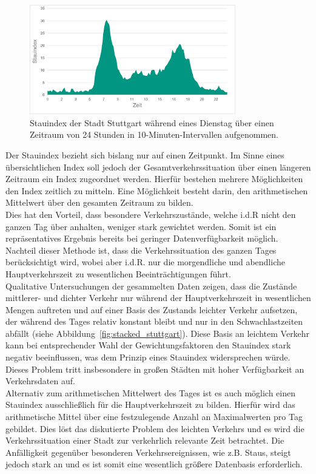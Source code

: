 \begin{figure}
  \centering
    \includegraphics[width=0.8\textwidth]{images/stauindex.png}
    \caption{Stauindex der Stadt Stuttgart während eines Dienstag über einen Zeitraum von 24 Stunden in 10-Minuten-Intervallen aufgenommen.}
    \label{fig:stauindex_stuttgart}
\end{figure}

Der Stauindex bezieht sich bislang nur auf einen Zeitpunkt. Im Sinne eines übersichtlichen Index soll jedoch der Gesamtverkehrssituation über einen längeren Zeitraum ein Index zugeordnet werden. Hierfür bestehen mehrere Möglichkeiten den Index zeitlich zu mitteln. Eine Möglichkeit besteht darin, den arithmetischen Mittelwert über den gesamten Zeitraum zu bilden.\\ 
Dies hat den Vorteil, dass besondere Verkehrszustände, welche i.d.R nicht den ganzen Tag über anhalten, weniger stark gewichtet werden. Somit ist ein repräsentatives Ergebnis bereits bei geringer Datenverfügbarkeit möglich.
Nachteil dieser Methode ist, dass die Verkehrssituation des ganzen Tages berücksichtigt wird, wobei aber i.d.R. nur die morgendliche und abendliche Hauptverkehrszeit zu wesentlichen Beeinträchtigungen führt.\\ 
Qualitative Untersuchungen der gesammelten Daten zeigen, dass die Zustände mittlerer- und dichter Verkehr nur während der Hauptverkehrszeit in wesentlichen Mengen auftreten und auf einer Basis des Zustands leichter Verkehr aufsetzen, der während des Tages relativ konstant bleibt und nur in den Schwachlastzeiten abfällt (siehe Abbildung~\ref{fig:stacked_stuttgart}). Diese Basis an leichtem Verkehr kann bei entsprechender Wahl der Gewichtungsfaktoren den Stauindex stark negativ beeinflussen, was dem Prinzip eines Stauindex widersprechen würde. Dieses Problem tritt insbesondere in großen Städten mit hoher Verfügbarkeit an Verkehrsdaten auf.\\ 
Alternativ zum arithmetischen Mittelwert des Tages ist es auch möglich einen Stauindex ausschließlich für die  Hauptverkehrszeit zu bilden. Hierfür wird das arithmetische Mittel über eine festzulegende Anzahl an Maximalwerten pro Tag gebildet. Dies löst das diskutierte Problem des leichten Verkehrs und es wird die Verkehrssituation einer Stadt zur verkehrlich relevante Zeit betrachtet. Die Anfälligkeit gegenüber besonderen Verkehrsereignissen, wie z.B. Staus, steigt jedoch stark an und es ist somit eine wesentlich größere Datenbasis erforderlich. \\

